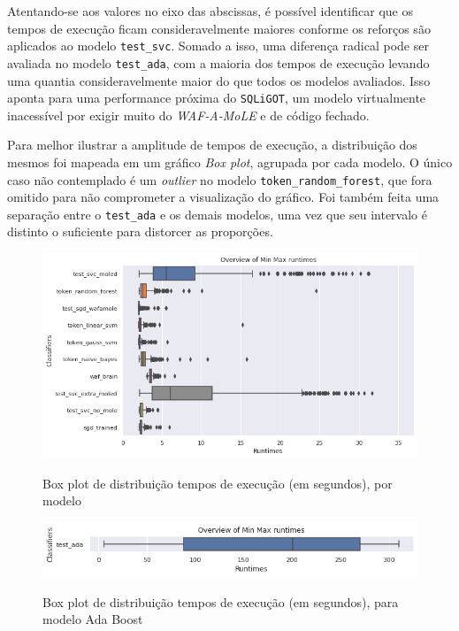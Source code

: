 Atentando-se aos valores no eixo das abscissas, é possível identificar que os tempos de execução ficam consideravelmente maiores conforme os reforços são aplicados ao modelo \verb+test_svc+. Somado a isso, uma diferença radical pode ser avaliada no modelo \verb+test_ada+, com a maioria dos tempos de execução levando uma quantia consideravelmente maior do que todos os modelos avaliados. Isso aponta para uma performance próxima do \verb+SQLiGOT+, um modelo virtualmente inacessível por exigir muito do \textit{WAF-A-MoLE} e de código fechado.

Para melhor ilustrar a amplitude de tempos de execução, a distribuição dos mesmos foi mapeada em um gráfico \textit{Box plot}, agrupada por cada modelo. O único caso não contemplado é um \textit{outlier} no modelo \verb+token_random_forest+, que fora omitido para não comprometer a visualização do gráfico. Foi também feita uma separação entre o \verb+test_ada+ e os demais modelos, uma vez que seu intervalo é distinto o suficiente para distorcer as proporções.

\begin{figure}[ht]
    \centering
    \caption{Box plot de distribuição tempos de execução (em segundos), por modelo}
    \includegraphics[width=18cm]{figuras/graficos/min_max_all.png} 
    \label{fig:min-max-all} 
\end{figure}

\begin{figure}[ht]
    \centering
    \caption{Box plot de distribuição tempos de execução (em segundos), para modelo Ada Boost}
    \includegraphics[width=18cm]{figuras/graficos/min_max_ada.png} 
    \label{fig:min-max-ada} 
\end{figure}

